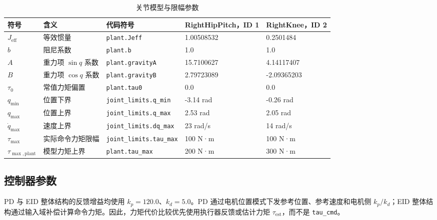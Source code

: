 \documentclass[12pt,a4paper]{ctexart}
\begin{document}
\begin{table}[htbp]
\centering
\footnotesize
\caption{关节模型与限幅参数}
\begin{tabularx}{\textwidth}{@{}p{}p{}p{}p{}p{}@{}}
\toprule
符号 & 含义 & 代码符号 & RightHipPitch，ID 1 & RightKnee，ID 2 \\
\midrule
$J_\mathrm{eff}$ & 等效惯量 & \texttt{plant.Jeff} & 1.00508532 & 0.2501484 \\
$b$ & 阻尼系数 & \texttt{plant.b} & 1.0 & 1.0 \\
$A$ & 重力项 $\sin q$ 系数 & \texttt{plant.gravityA} & 15.7100627 & 4.14117407 \\
$B$ & 重力项 $\cos q$ 系数 & \texttt{plant.gravityB} & 2.79723089 & -2.09365203 \\
$\tau_0$ & 常值力矩偏置 & \texttt{plant.tau0} & 0.0 & 0.0 \\
$q_{\min}$ & 位置下界 & \texttt{joint\_limits.q\_min} & -3.14 rad & -0.26 rad \\
$q_{\max}$ & 位置上界 & \texttt{joint\_limits.q\_max} & 2.53 rad & 2.05 rad \\
$\dot q_{\max}$ & 速度上界 & \texttt{joint\_limits.dq\_max} & 23 rad/s & 14 rad/s \\
$\tau_{\max}$ & 实际命令力矩限幅 & \texttt{joint\_limits.tau\_max} & 100 N·m & 100 N·m \\
$\tau_{\max,\mathrm{plant}}$ & 模型力矩上界 & \texttt{plant.tau\_max} & 200 N·m & 300 N·m \\
\bottomrule
\end{tabularx}
\end{table}


\subsection{控制器参数}


PD 与 EID 整体结构的反馈增益均使用 $k_p=120.0$、$k_d=5.0$。PD 通过电机位置模式下发参考位置、参考速度和电机侧 $k_p/k_d$；EID 整体结构通过输入域补偿计算命令力矩。因此，力矩代价比较优先使用执行器反馈或估计力矩 $\tau_\mathrm{est}$，而不是 \texttt{tau\_cmd}。
\end{document}
